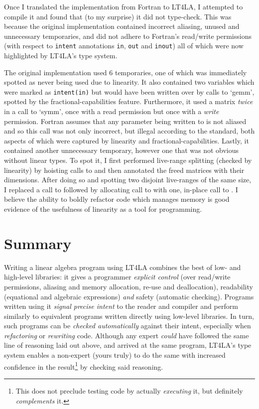 Once I translated the implementation from Fortran to LT4LA, I attempted to
compile it and found that (to my surprise) it did not type-check. This was
because the original implementation contained incorrect aliasing, unused and
unnecessary temporaries, and did not adhere to Fortran's read/write permissions
(with respect to \texttt{intent} annotations \texttt{in}, \texttt{out} and
\texttt{inout}) all of which were now highlighted by LT4LA's type system.

The original implementation used 6 temporaries, one of which was immediately
spotted as never being used due to linearity. It also contained two variables
which were marked as \texttt{intent(in)} but would have been written over by
calls to `gemm', spotted by the fractional-capabilities feature. Furthermore,
it used a matrix \emph{twice} in a call to `symm', once with a read permission
but once with a \emph{write} permission.  Fortran assumes that any parameter
being written to is not aliased and so this call was not only incorrect, but
illegal according to the standard, both aspects of which were captured by
linearity and fractional-capabilities. Lastly, it contained another unnecessary
temporary, however one that was not obvious without linear types. To spot it, I
first performed live-range splitting (checked by linearity) by hoisting calls
to  and then annotated the freed matrices with their dimensions.
After doing so and spotting two disjoint live-ranges of the same size, I
replaced a call to  followed by allocating call to 
with one, in-place call to . I believe the ability to boldly
refactor code which manages memory is good evidence of the usefulness of
linearity as a tool for programming.

\section{Summary}

Writing a linear algebra program using LT4LA combines the best of low- and
high-level libraries: it gives a programmer \emph{explicit
control} (over read/write permissions, aliasing and memory allocation, re-use
and deallocation), readability (equational and algebraic expressions)
\emph{and} safety (automatic checking). Programs written using it \emph{signal
precise intent} to the reader and compiler and perform similarly to equivalent
programs written directly using low-level libraries. In turn,
such programs can be \emph{checked automatically} against their intent,
especially when \emph{refactoring} or \emph{rewriting} code. Although any
expert \emph{could} have followed the same line of reasoning laid out above,
and arrived at the same program, LT4LA's type system enables a non-expert
(yours truly) to do the same with increased confidence in the
result\footnote{This does not preclude testing code by actually
\emph{executing} it, but definitely \emph{complements} it.} by checking said
reasoning.
